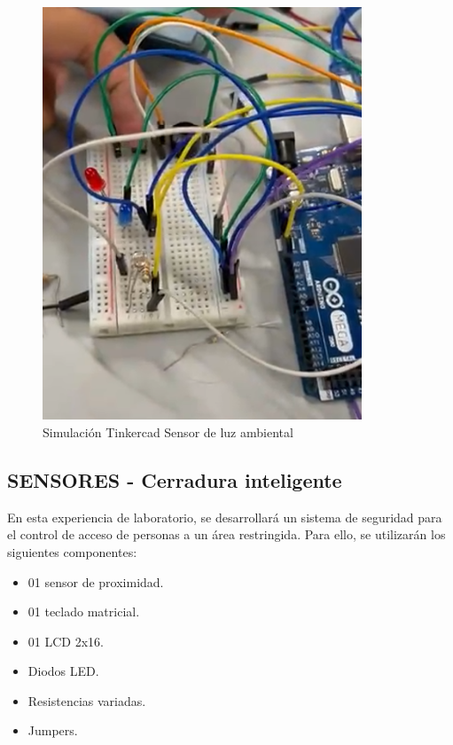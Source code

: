 \documentclass{article}
\begin{document}
\begin{figure}[H]
    \centering
    \includegraphics[width=0.85\textwidth]{img/sensores_chkp_2_1.png}
    \caption{Simulación Tinkercad Sensor de luz ambiental}
    \label{fig:luz_ambiental}
\end{figure}


\subsection{SENSORES - Cerradura inteligente}

En esta experiencia de laboratorio, se desarrollará un sistema de seguridad para el control de acceso de personas a un área restringida. Para ello, se utilizarán los siguientes componentes: 

\begin{itemize}
    \item 01 sensor de proximidad.
    \item 01 teclado matricial.
    \item 01 LCD 2x16.
    \item Diodos LED.
    \item Resistencias variadas.
    \item Jumpers.
\end{itemize}
\end{document}
